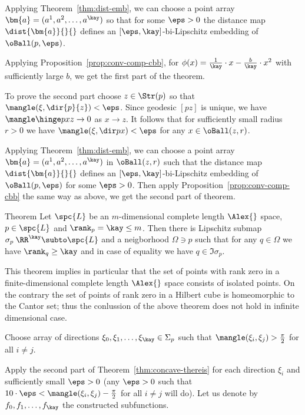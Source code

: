 Applying Theorem~\ref{thm:dist-emb},
we can choose a point array $\bm{a}=(a^1,a^2,\dots,a^\kay)$ so that for some $\eps>0$
the distance map $\dist{\bm{a}}{}{}$ defines an $[\eps,\kay]$-bi-Lipschitz embedding 
of $\oBall(p,\eps)$.

Applying Proposition~\ref{prop:conv-comp-cbb},
for $\phi(x)={\tfrac1\kay}\cdot x-\tfrac{b}{\kay}\cdot x^2$ 
with sufficiently large $b$, we get the first part of the theorem.

To prove the second part choose $z\in\Str(p)$ so that $\mangle(\xi, \dir{p}{z})<\eps$.
Since geodesic $[pz]$ is unique,
we have $\mangle\hinge pxz\to 0$ as $x\to z$.
It follows that for sufficiently small radius $r>0$
we have 
$\mangle(\xi,\dir px)<\eps$
for any $x\in\oBall(z,r)$.

Applying Theorem~\ref{thm:dist-emb}, we can choose a point array $\bm{a}=(a^1,a^2,\dots,a^\kay)$ in $\oBall(z,r)$ such that the distance map $\dist{\bm{a}}{}{}$ defines an $[\eps,\kay]$-bi-Lipschitz embedding 
of $\oBall(p,\eps)$ for some $\eps>0$.
Then apply Proposition~\ref{prop:conv-comp-cbb} the same way as above, we get the second part of theorem.
\qeds


\begin{thm}{Theorem}\label{thm:rank=kay}
Let $\spc{L}$ be an $m$-dimensional complete length $\Alex{}$ space,
$p\in\spc{L}$ and $\rank_p=\kay\le m$.
Then there is Lipschitz submap $\sigma_p\:\RR^\kay\subto\spc{L}$
and a neigborhood $\Omega\ni p$
such that for any $q\in\Omega$ we have 
$\rank_q\ge \kay$  
and in case of equality we have $q\in\Im \sigma_p$.
\end{thm}

This theorem implies in particular that the set of points with rank zero in a finite-dimensional complete length $\Alex{}$ space consists of isolated points. 
On the contrary the set of points of rank zero in a Hilbert cube %
is homeomorphic to the Cantor set;
thus the conlussion of the above theorem does not hold in infinite dimensional case.

Choose array of directions $\xi_0,\xi_1,\dots,\xi_\kay\in\Sigma_p$ 
such that $\mangle(\xi_i,\xi_j)>\tfrac\pi2$ for all $i\not=j$.

Apply the second part of Theorem~\ref{thm:concave-thereis} for each direction $\xi_i$ and sufficiently small $\eps>0$
(any $\eps>0$ such that $10\cdot\eps< \mangle(\xi_i,\xi_j)-\tfrac\pi2$ for all $i\not=j$ will do).
Let us denote by $f_0,f_1,\dots, f_\kay$ the constructed subfunctions.

